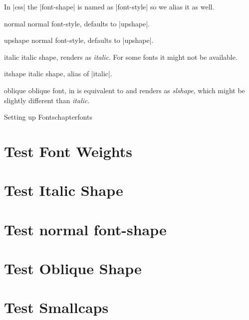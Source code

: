 In |css| the |font-shape| is named as |font-style| so we alias it as well. 

\begin{marglist}
\item[normal] normal font-style, defaults to |upshape|.
\item[upshape] normal font-style, defaults to |upshape|. 
\item[italic] italic shape, renders as {\itshape italic}. For some fonts it might not be available.
\item[itshape] italic shape, alias of |italic|.
\item[oblique] oblique font, in \latexe is equivalent to \cmd{\slshape} and renders as {\slshape slshape}, which might be slightly different than {\itshape italic}.
\end{marglist}


\begin{texexample}{Setting up Fonts}{chapterfonts}
\chapter[fonts]{Test Font Weights}
\lorem
{}
\chapter{Test Italic Shape}
\lorem
{}
\chapter{Test normal font-shape}
\lorem
{}
\chapter{Test Oblique Shape}
\lorem
{}
\chapter{Test Smallcaps}
\lorem
\end{texexample}



